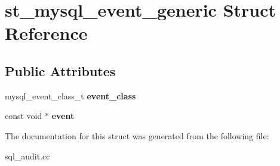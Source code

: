 \hypertarget{structst__mysql__event__generic}{}\section{st\+\_\+mysql\+\_\+event\+\_\+generic Struct Reference}
\label{structst__mysql__event__generic}
\subsection*{Public Attributes}
\begin{DoxyCompactItemize}
\item 
\mbox{\label{structst__mysql__event__generic_af29f7da5b58654abe1d0c4bee0d01c3d}} 
mysql\+\_\+event\+\_\+class\+\_\+t {\bfseries event\+\_\+class}
\item 
\mbox{\label{structst__mysql__event__generic_a8e8a150f227dd30021fa87460358f845}} 
const void $\ast$ {\bfseries event}
\end{DoxyCompactItemize}


The documentation for this struct was generated from the following file\+:\begin{DoxyCompactItemize}
\item 
sql\+\_\+audit.\+cc\end{DoxyCompactItemize}

